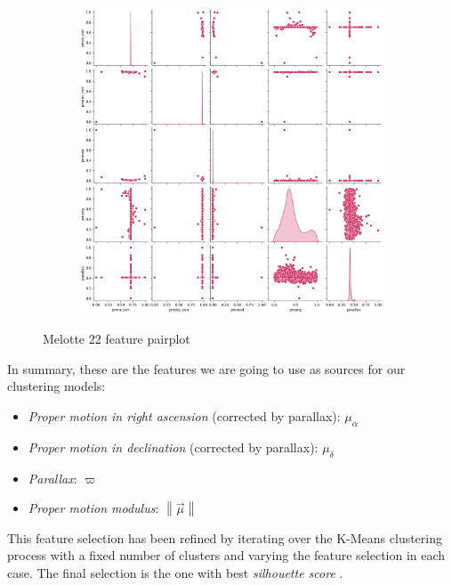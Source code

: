 \documentclass[11pt, a4paper, english]{book}
\begin{document}
\begin{figure}[htbp]
  \centering
  \begin{subfigure}{\textwidth}
    \centering
    \includegraphics[width=\textwidth]{../figures/melotte_22/features_melotte_22.png}
  \end{subfigure}
  \caption{Melotte 22 feature pairplot}
  \label{fig:features_melotte_22}
\end{figure}

\newpage

In summary, these are the features we are going to use as sources for our clustering models:

\begin{itemize}
  \item \emph{Proper motion in right ascension} (corrected by parallax): $\mu_{\alpha}$
  \item \emph{Proper motion in declination} (corrected by parallax): $\mu_{\delta}$
  \item \emph{Parallax}: $\varpi$
  \item \emph{Proper motion modulus}: $\left\| \vec{\mu} \right\|$
\end{itemize}

This feature selection has been refined by iterating over the K-Means clustering process with a fixed number of clusters and varying the feature selection in each case.
The final selection is the one with best \emph{silhouette score} \cite{rousseeuw1987silhouettes}.
\end{document}
